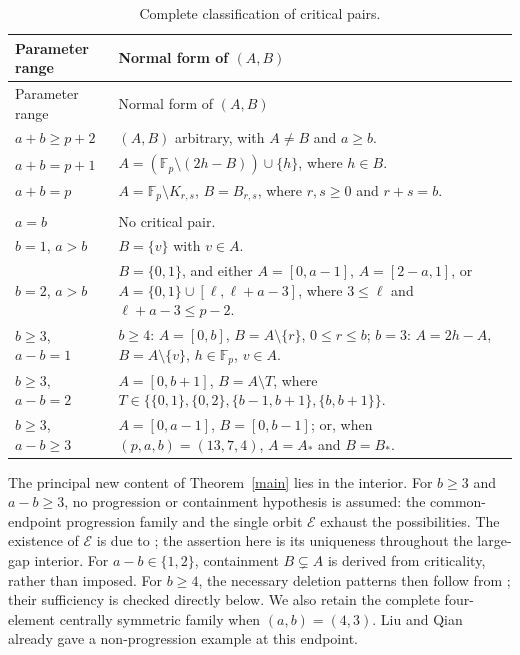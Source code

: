 \documentclass[12pt]{article}
\theoremstyle{remark}
\newcommand{\F}{\mathbb{F}_p}
\begin{document}
\begingroup
\renewcommand{\arraystretch}{1.08}
\begin{longtable}{@{}>{\raggedright\arraybackslash}p{}>{\raggedright\arraybackslash}p{}@{}}
\caption{Complete classification of critical pairs.}
\label{total}\\
\toprule
\textnormal{Parameter range}&\textnormal{Normal form of $(A,B)$}\\
\midrule
\endfirsthead
\toprule
\textnormal{Parameter range}&\textnormal{Normal form of $(A,B)$}\\
\midrule
\endhead
$a+b\ge p+2$&$(A,B)$ arbitrary, with $A\ne B$ and $a\ge b$.\\[3pt]
$a+b=p+1$&$A=(\F\setminus(2h-B))\cup\{h\}$, where $h\in B$.\\[3pt]
$a+b=p$&$A=\F\setminus K_{r,s}$, $B=B_{r,s}$, where $r,s\ge0$ and $r+s=b$.\\
\midrule
\multicolumn{2}{@{}l}{\emph{Interior range $a+b\le p-1$:}}\\[2pt]
$a=b$&No critical pair.\\[3pt]
$b=1$, $a>b$&$B=\{v\}$ with $v\in A$.\\[4pt]
$b=2$, $a>b$&$B=\{0,1\}$, and either\newline
$A=[0,a-1]$, $A=[2-a,1]$, or\newline
$A=\{0,1\}\cup[\ell,\ell+a-3]$, where $3\le\ell$ and $\ell+a-3\le p-2$.\\[4pt]
$b\ge3$, $a-b=1$&$b\ge4$: $A=[0,b]$, $B=A\setminus\{r\}$, $0\le r\le b$;\newline
$b=3$: $A=2h-A$, $B=A\setminus\{v\}$, $h\in\F$, $v\in A$.\\[4pt]
$b\ge3$, $a-b=2$&$A=[0,b+1]$, $B=A\setminus T$, where\newline
$T\in\bigl\{\{0,1\},\{0,2\},\{b-1,b+1\},\{b,b+1\}\bigr\}$.\\[4pt]
$b\ge3$, $a-b\ge3$&$A=[0,a-1]$, $B=[0,b-1]$;\newline
or, when $(p,a,b)=(13,7,4)$, $A=A_*$ and $B=B_*$.\\
\bottomrule
\end{longtable}
\endgroup

The principal new content of Theorem~\ref{main} lies in the interior.
For $b\ge3$ and $a-b\ge3$, no progression or containment hypothesis is
assumed: the common-endpoint progression family and the single orbit
$\mathcal E$ exhaust the possibilities.  The existence of $\mathcal E$
is due to \cite[Example 4.1]{HLY}; the assertion here is its uniqueness
throughout the large-gap interior.  For $a-b\in\{1,2\}$, containment
$B\subsetneq A$ is derived from criticality, rather than imposed.
For $b\ge4$, the necessary deletion patterns then follow from
\cite[Proposition 3.4]{LQ}; their sufficiency is checked directly below.
We also retain the complete four-element centrally symmetric family
when $(a,b)=(4,3)$.  Liu and Qian \cite[Remark 3.5]{LQ} already gave
a non-progression example at this endpoint.
\end{document}

